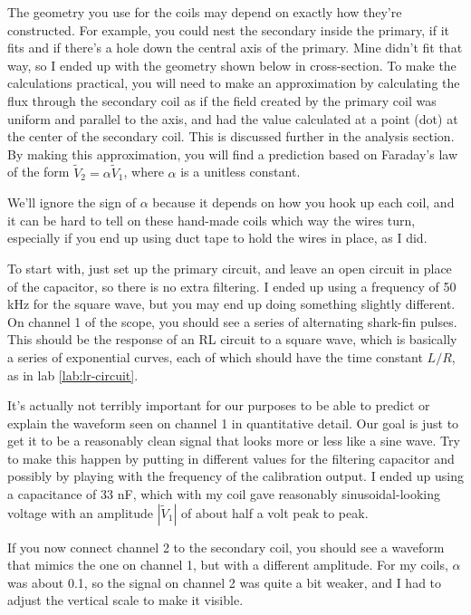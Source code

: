 The geometry you use for the coils may depend on exactly how they're constructed.
For example, you could nest the secondary inside the primary, if it fits
and if there's a hole down the central axis of the primary. Mine didn't
fit that way, so I ended up with the geometry shown below in cross-section. To make the
calculations practical, you will need to make an approximation by
calculating the flux through the secondary coil as if the field created by
the primary coil was uniform and parallel to the axis, and had the value
calculated at a point (dot) at the center of the secondary coil. This is
discussed further in the analysis section. By making this approximation,
you will find a prediction based on Faraday's law of the form $\tilde{V}_2=\alpha \tilde{V}_1$,
where $\alpha$ is a unitless constant. 


We'll ignore the sign of $\alpha$ because
it depends on how you hook up each coil, and it can be hard to tell on these hand-made
coils which way the wires turn, especially if you end up using duct tape to hold the
wires in place, as I did.

\observations

To start with,  just set up the primary circuit, and leave an open circuit
in place of the capacitor, so there is no extra filtering. I ended up using
a frequency of 50 kHz for the square wave, but you may end up doing something
slightly different. On channel 1 of the scope, you should see a series of
alternating shark-fin pulses. This should be the response of an RL circuit
to a square wave, which is basically a series of exponential curves, each
of which should have the time constant $L/R$, as in lab \ref{lab:lr-circuit}.

It's actually not terribly
important for our purposes to be able to predict or explain the waveform seen on channel
1 in quantitative detail. Our goal is just to get it to be a reasonably clean signal
that looks more or less like a sine wave. Try to make this happen by putting in
different values for the filtering capacitor and possibly by playing with the
frequency of the calibration output. I ended up using a capacitance of 33 nF,
which with my coil gave reasonably sinusoidal-looking voltage with an amplitude
$|\tilde{V}_1|$ of about half a volt peak to peak.

If you now connect channel 2 to the secondary coil, you should see a waveform
that mimics the one on channel 1, but with a different amplitude. For my coils,
$\alpha$ was about 0.1, so the signal on channel 2 was quite a bit weaker, and I
had to adjust the vertical scale to make it visible.


